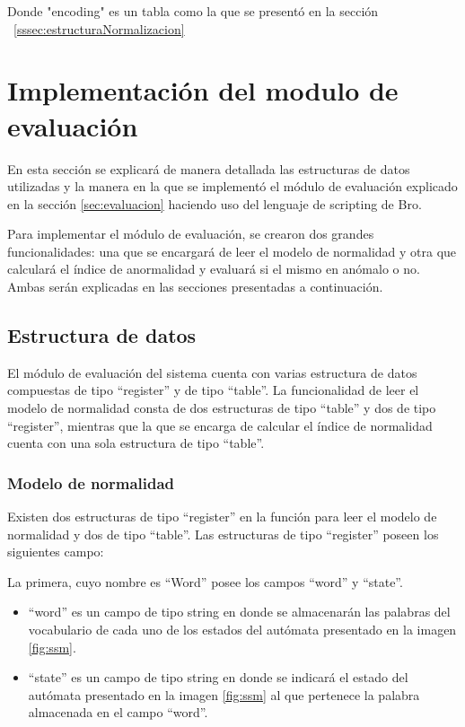 Donde "encoding" es un tabla como la que se presentó en la sección ~\ref{sssec:estructuraNormalizacion}
        
\section{Implementación del modulo de evaluación}
En esta sección se explicará de manera detallada las estructuras de datos utilizadas y la manera en la que se implementó el módulo de evaluación explicado en la sección \ref{sec:evaluacion}  haciendo uso del lenguaje de scripting de Bro. 

Para implementar el módulo de evaluación, se crearon dos grandes funcionalidades: una que se encargará de leer el modelo de normalidad y  otra que calculará el índice de anormalidad y evaluará si el mismo en anómalo o no. Ambas serán explicadas en las secciones presentadas a continuación.

\subsection{Estructura de datos}

El módulo de evaluación del sistema cuenta con varias estructura de datos compuestas de tipo “register” y de tipo “table”. La funcionalidad de leer el modelo de normalidad consta de dos estructuras de tipo “table” y dos de tipo “register”, mientras que la que se encarga de calcular el índice de normalidad cuenta con una sola estructura de tipo “table”.

\subsubsection{Modelo de normalidad}
\label{sssec:estructuraModelo}

Existen dos estructuras de tipo “register” en la función para leer el modelo de normalidad y dos de tipo “table”.
Las estructuras de tipo “register” poseen los siguientes campo:

La primera, cuyo nombre es “Word” posee los campos “word” y  “state”.

\begin{itemize}
\item “word” es un campo de tipo string en donde se almacenarán las palabras del vocabulario de cada uno de los estados del autómata presentado en la imagen \ref{fig:ssm}.
\item “state” es un campo de tipo string en donde se indicará el estado del autómata presentado en la imagen \ref{fig:ssm} al que pertenece la palabra almacenada en el campo “word”.
\end{itemize}

